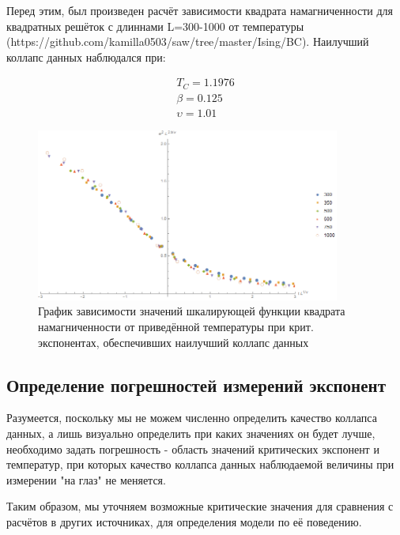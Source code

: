 Перед этим, был произведен расчёт зависимости квадрата намагниченности для квадратных решёток с длиннами L=300-1000 от температуры (https://github.com/kamilla0503/saw/tree/master/Ising/BC\cite{web:sawRepos}). Наилучший коллапс данных наблюдался при:

\begin{align*}
    T_{C} = 1.1976 \\
    \beta = 0.125 \\
    \upsilon = 1.01
\end{align*}

\begin{figure}[!h]
    \centering
    \includegraphics[width=100mm]{Sections/Images/DatColMagn2_3.png}
    \caption{График зависимости значений шкалирующей функции квадрата намагниченности от приведённой температуры при крит. экспонентах, обеспечивших наилучший коллапс данных}
    \label{fig:DatColM2_3}
\end{figure}

\subsection{Определение погрешностей измерений экспонент}

Разумеется, поскольку мы не можем численно определить качество коллапса данных, а лишь визуально определить при каких значениях он будет лучше, необходимо задать погрешность - область значений критических экспонент и температур, при которых качество коллапса данных наблюдаемой величины при измерении "на глаз" не меняется.

Таким образом, мы уточняем возможные критические значения для сравнения с расчётов в других источниках, для определения модели по её поведению.

\newpage

